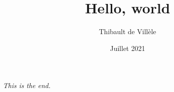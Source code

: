 \documentclass[a4paper,12pt]{report}
\title{Hello, world}
\author{Thibault de Villèle}
\date{Juillet 2021}
\renewcommand\maketitle{}
\begin{document}
\maketitle






\textit{This is the end.}\\\hline{}
\end{document}
